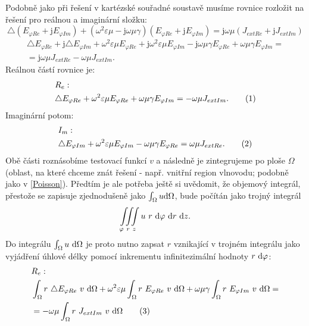 \documentclass[12pt,a4paper,oneside]{article}
\numberwithin{equation}{section} %
\numberwithin{figure}{section} %
\numberwithin{table}{section} %
\newcommand{\mj}{\mathrm{j}} %
\newcommand\numberthis{\addtocounter{equation}{1}\tag{\theequation}}
\begin{document}
Podobně jako při řešení v kartézské souřadné soustavě musíme rovnice rozložit na řešení pro reálnou a imaginární složku:
\begin{equation}
\triangle (E _{\varphi Re} + \mj E _{\varphi Im}) + (\omega ^2 \varepsilon \mu - \mj \omega \mu \gamma) (E _{\varphi Re} + \mj E _{\varphi Im}) = \mj \omega \mu (J _{extRe} + \mj J _{extIm})
\end{equation}
\begin{equation}
\begin{split}
\triangle E _{\varphi Re} + \mj \triangle E _{\varphi Im} + \omega ^2 \varepsilon \mu E_ {\varphi Re} + \mj \omega ^2 \varepsilon \mu E _{\varphi Im} - \mj \omega \mu \gamma E _{\varphi Re} + \omega \mu \gamma E _{\varphi Im} =\\
= \mj \omega \mu J _{extRe} - \omega \mu J _{extIm} .
\end{split}
\end{equation}
Reálnou částí rovnice je:
\begin{align*}
&R_{e}:
\\
&\triangle E_ {\varphi Re} + \omega ^2 \varepsilon \mu E_ {\varphi Re} + \omega \mu \gamma E _{\varphi Im} = - \omega \mu J _{extIm} .
\numberthis
\end{align*}
Imaginární potom:
\begin{align*}
&I_{m}:
\\
&\triangle E _{\varphi Im} + \omega ^2 \varepsilon \mu E _{\varphi Im} - \omega \mu \gamma E _{\varphi Re} = \omega \mu J _{extRe} .
\numberthis
\end{align*}
Obě části roznásobíme testovací funkcí $v$ a následně je zintegrujeme po ploše $\Omega$ (oblast, na které chceme znát řešení - např. vnitřní region vlnovodu; podobně jako v \ref{Poisson}). Předtím je ale potřeba ještě si uvědomit, že objemový integrál, přestože se zapisuje zjednodušeně jako $\int _{\Omega} u \mathrm{d} \Omega$, bude počítán jako trojný integrál 
\begin{equation}
\label{trojnyI}
\iiint \limits_{\varphi ~ r ~ z} u ~ r ~ \mathrm{d} \varphi ~ \mathrm{d} r ~ \mathrm{d} z . 
\end{equation}
Do integrálu $\int _{\Omega} u ~ \mathrm{d} \Omega$ je proto nutno zapsat $r$ vznikající v trojném integrálu jako vyjádření úhlové délky pomocí inkrementu infinitezimální hodnoty $r ~ \mathrm{d} \varphi$: 
\begin{align*}
&R_e:
\\
&\int _{\Omega} r ~ \triangle E _{\varphi Re} ~ v ~ \ud \Omega + \omega ^2 \varepsilon \mu \int _{\Omega} r ~ E _{\varphi Re} ~ v ~ \ud \Omega +  \omega \mu \gamma \int _{\Omega} r ~ E _{\varphi Im} ~ v ~ \ud \Omega =\\
&= - \omega \mu \int _{\Omega} r ~ J _{extIm} ~ v ~ \ud \Omega
\numberthis
\end{align*}
\end{document}
